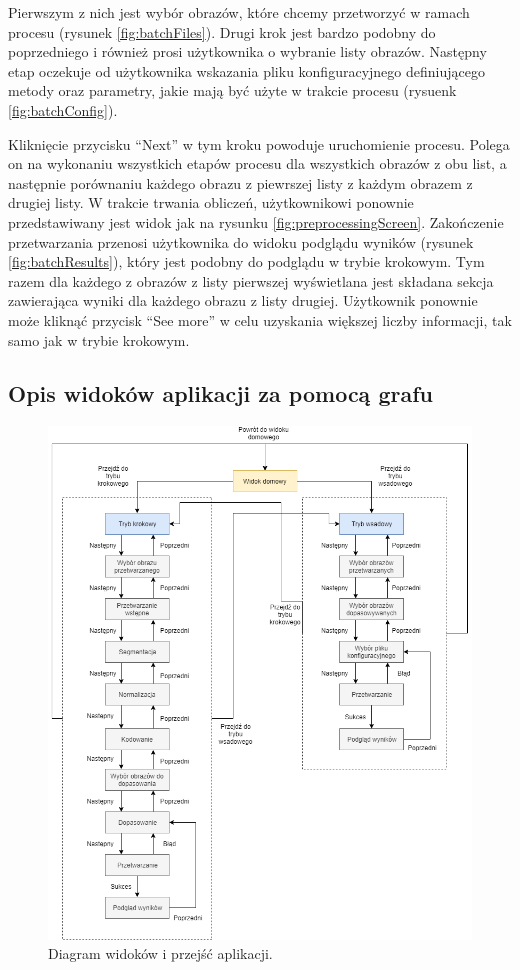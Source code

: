 \documentclass[10pt,polish,a4paper,oneside]{ppfcmthesis}
\begin{document}
Pierwszym z nich
jest wybór obrazów, które chcemy przetworzy\'c w ramach procesu (rysunek \ref{fig:batchFiles}).
Drugi krok jest bardzo podobny do poprzedniego i również prosi użytkownika o wybranie listy obrazów.
Następny etap oczekuje od użytkownika wskazania pliku konfiguracyjnego definiującego metody oraz
parametry, jakie mają by\'c użyte w trakcie procesu (rysuenk \ref{fig:batchConfig}).\newline

Kliknięcie
przycisku ``Next'' w tym kroku powoduje uruchomienie procesu. Polega on na wykonaniu wszystkich etapów
procesu dla wszystkich obrazów z obu list, a następnie porównaniu każdego obrazu z piewrszej listy
z każdym obrazem z drugiej listy. W trakcie trwania obliczeń, użytkownikowi ponownie przedstawiwany
jest widok jak na rysunku \ref{fig:preprocessingScreen}. Zakończenie przetwarzania przenosi użytkownika
do widoku podglądu wyników (rysunek \ref{fig:batchResults}), który jest podobny do podglądu w trybie krokowym. Tym razem dla każdego
z obrazów z listy pierwszej wyświetlana jest składana sekcja zawierająca wyniki dla każdego obrazu
z listy drugiej. Użytkownik ponownie może klikną\'c przycisk ``See more'' w celu uzyskania większej
liczby informacji, tak samo jak w trybie krokowym.\newpage

\subsection{Opis widoków aplikacji za pomocą grafu}

\begin{figure}[h]
    \centering
    \includegraphics[width=\textwidth,height=\textheight, keepaspectratio]{images/widokiMgr.png}
    \caption{Diagram widoków i przejś\'c aplikacji.}
\end{figure}
\end{document}
